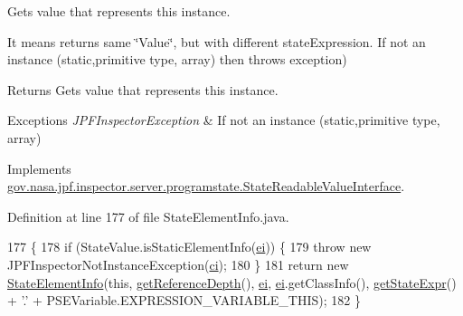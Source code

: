Gets value that represents this instance. 

It means returns same \char`\"{}\+Value\char`\"{}, but with different state\+Expression. If not an instance (static,primitive type, array) then throws exception)

\begin{DoxyReturn}{Returns}
Gets value that represents this instance. 
\end{DoxyReturn}

\begin{DoxyExceptions}{Exceptions}
{\em J\+P\+F\+Inspector\+Exception} & If not an instance (static,primitive type, array) \\
\hline
\end{DoxyExceptions}


Implements \hyperlink{interfacegov_1_1nasa_1_1jpf_1_1inspector_1_1server_1_1programstate_1_1_state_readable_value_interface_a726b9bd70d7e76da89660f6a614d7fe1}{gov.\+nasa.\+jpf.\+inspector.\+server.\+programstate.\+State\+Readable\+Value\+Interface}.



Definition at line 177 of file State\+Element\+Info.\+java.


\begin{DoxyCode}
177                                                                                      \{
178     \textcolor{keywordflow}{if} (StateValue.isStaticElementInfo(\hyperlink{classgov_1_1nasa_1_1jpf_1_1inspector_1_1server_1_1programstate_1_1_state_element_info_a8ab89d35f66b04255ccd81a976cf5a63}{ei})) \{
179       \textcolor{keywordflow}{throw} \textcolor{keyword}{new} JPFInspectorNotInstanceException(\hyperlink{classgov_1_1nasa_1_1jpf_1_1inspector_1_1server_1_1programstate_1_1_state_element_info_acdd8034996961333e13ef1821a8f5cbf}{ci});
180     \}
181     \textcolor{keywordflow}{return} \textcolor{keyword}{new} \hyperlink{classgov_1_1nasa_1_1jpf_1_1inspector_1_1server_1_1programstate_1_1_state_element_info_a65fa1614d57edc47dcf7065ac8072a77}{StateElementInfo}(\textcolor{keyword}{this}, \hyperlink{classgov_1_1nasa_1_1jpf_1_1inspector_1_1server_1_1programstate_1_1_state_node_af59b1ac0319251e657293c810a16cdd9}{getReferenceDepth}(), 
      \hyperlink{classgov_1_1nasa_1_1jpf_1_1inspector_1_1server_1_1programstate_1_1_state_element_info_a8ab89d35f66b04255ccd81a976cf5a63}{ei}, \hyperlink{classgov_1_1nasa_1_1jpf_1_1inspector_1_1server_1_1programstate_1_1_state_element_info_a8ab89d35f66b04255ccd81a976cf5a63}{ei}.getClassInfo(), \hyperlink{classgov_1_1nasa_1_1jpf_1_1inspector_1_1server_1_1programstate_1_1_state_node_a54c1c8d91f93c078171589f844252bdf}{getStateExpr}() + \textcolor{charliteral}{'.'} + PSEVariable.EXPRESSION\_VARIABLE\_THIS);
182   \}
\end{DoxyCode}
